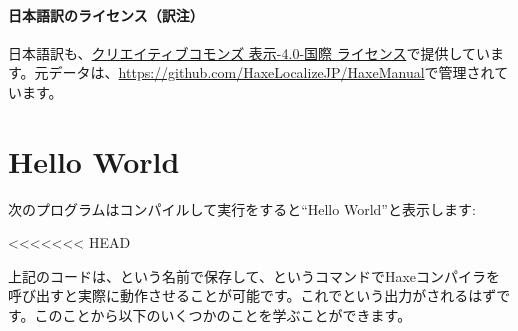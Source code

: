 \paragraph{日本語訳のライセンス（訳注）}

日本語訳も、\href{http://creativecommons.org/licenses/by/4.0/}{クリエイティブコモンズ 表示-4.0-国際 ライセンス}で提供しています。元データは、\href{https://github.com/HaxeLocalizeJP/HaxeManual}{https://github.com/HaxeLocalizeJP/HaxeManual}で管理されています。

\section{Hello World}
\label{introduction-hello-world}

次のプログラムはコンパイルして実行をすると``Hello World''と表示します:

<<<<<<< HEAD

上記のコードは、という名前で保存して、というコマンドでHaxeコンパイラを呼び出すと実際に動作させることが可能です。これでという出力がされるはずです。このことから以下のいくつかのことを学ぶことができます。


